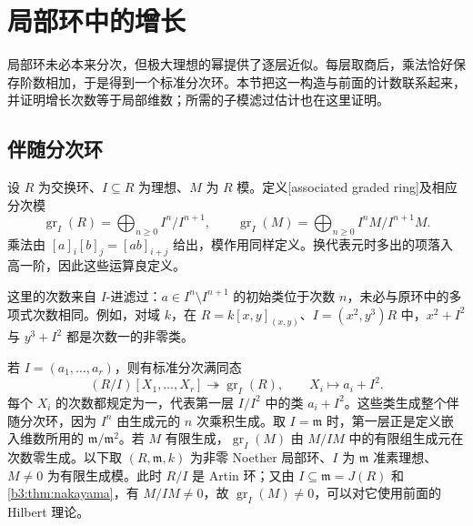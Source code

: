 
\section{局部环中的增长}
\label{b3:sec:1104}

局部环未必本来分次，但极大理想的幂提供了逐层近似。每层取商后，乘法恰好保存阶数相加，于是得到一个标准分次环。本节把这一构造与前面的计数联系起来，并证明增长次数等于局部维数；所需的子模滤过估计也在这里证明。

\subsection{伴随分次环}
\label{b3:subsec:1104:01}

\begin{definition}\label{b3:def:associated-graded-adic}
	设 \(R\) 为交换环、\(I\subseteq R\) 为理想、\(M\) 为 \(R\) 模。定义[associated graded ring]及相应分次模
	\[
		\operatorname{gr}_I(R)=\bigoplus_{n\ge0}I^n/I^{n+1},\qquad \operatorname{gr}_I(M)=\bigoplus_{n\ge0}I^nM/I^{n+1}M.
	\]
	乘法由 \([a]_i[b]_j=[ab]_{i+j}\) 给出，模作用同样定义。换代表元时多出的项落入高一阶，因此这些运算良定义。
\end{definition}

这里的次数来自 \(I\)-进滤过：\(a\in I^n\setminus I^{n+1}\) 的初始类位于次数 \(n\)，未必与原环中的多项式次数相同。例如，对域 \(k\)，在 \(R=k[x,y]_{(x,y)}\)、\(I=(x^2,y^3)R\) 中，\(x^2+I^2\) 与 \(y^3+I^2\) 都是次数一的非零类。

若 \(I=(a_1,\ldots,a_r)\)，则有标准分次满同态
\[
	(R/I)[X_1,\ldots,X_r]\twoheadrightarrow\operatorname{gr}_I(R), \qquad X_i\longmapsto a_i+I^2.
\]
每个 \(X_i\) 的次数都规定为一，代表第一层 \(I/I^2\) 中的类 \(a_i+I^2\)。这些类生成整个伴随分次环，因为 \(I^n\) 由生成元的 \(n\) 次乘积生成。取 \(I=\mathfrak m\) 时，第一层正是定义嵌入维数所用的 \(\mathfrak m/\mathfrak m^2\)。若 \(M\) 有限生成，\(\operatorname{gr}_I(M)\) 由 \(M/IM\) 中的有限组生成元在次数零生成。以下取 \((R,\mathfrak m,k)\) 为非零 Noether 局部环、\(I\) 为 \(\mathfrak m\) 准素理想、\(M\ne0\) 为有限生成模。此时 \(R/I\) 是 Artin 环；又由 \(I\subseteq\mathfrak m=J(R)\) 和\cref{b3:thm:nakayama}，有 \(M/IM\ne0\)，故 \(\operatorname{gr}_I(M)\ne0\)，可以对它使用前面的 Hilbert 理论。

